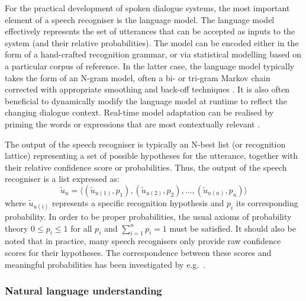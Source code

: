 
For the practical development of spoken dialogue systems, the most important element of a speech recogniser is the language model.  The language model effectively represents the set of utterances that can be accepted as inputs to the system (and their relative probabilities).  The model can be encoded either in the form of a hand-crafted recognition grammar, or via statistical modelling based on a particular corpus of reference.  In the latter case, the language model typically takes the form of an N-gram model, often a bi- or tri-gram Markov chain corrected with appropriate smoothing and back-off techniques  \citep{Jelinek:1998,ChenG99}.  It is also often beneficial to dynamically modify the language model at runtime to reflect the changing dialogue context.  Real-time model adaptation can be realised by priming the words or expressions that are most contextually relevant \citep{gruenstein2005context,ESSLLI2008-springerreprint}.

The output of the speech recogniser is typically an N-best list (or recognition lattice) representing a set of possible hypotheses for the utterance, together with their relative confidence score or probabilities.  Thus, the output of the speech recogniser is a list expressed as: 
\begin{equation*}
\tilde{u}_u = \langle (\tilde{u}_{u(1)}, p_{1}), (\tilde{u}_{u(2)}, p_{2}), \dots, (\tilde{u}_{u(n)}, p_{n})\rangle
\end{equation*}
where $\tilde{u}_{u(i)}$ represents a specific recognition hypothesis and $p_{i}$ its corresponding probability. In order to be proper probabilities,  the usual axioms of probability theory $0 \leq p_{i} \leq 1$ for all $p_{i}$ and $\sum_{i=1}^n p_{i} = 1$ must be satisfied.   It should also be noted that in practice, many speech recognisers only provide raw confidence scores for their hypotheses.  The correspondence between these scores and meaningful probabilities has been investigated by e.g.\ \cite{Williams08}. 

\subsubsection*{Natural language understanding}
\label{section:speechunderstanding}

